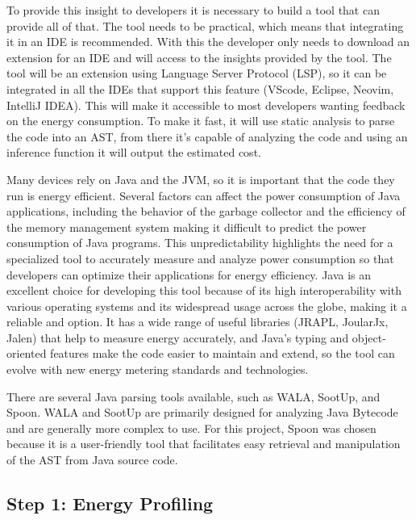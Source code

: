 \documentclass[sigplan]{acmart}
\begin{document}
To provide this insight to developers it is necessary to build a tool that can provide all of that. The tool needs to be practical, which means that integrating it in an IDE is recommended. With this the developer only needs to download an extension for an IDE and will access to the insights provided by the tool.
The tool will be an extension using Language Server Protocol (LSP), so it can be integrated in all the IDEs that support this feature (VScode, Eclipse, Neovim, IntelliJ IDEA). This will make it accessible to most developers wanting feedback on the energy consumption. To make it fast, it will use static analysis to parse the code into an AST, from there it's capable of analyzing the code and using an inference function it will output the estimated cost.

Many devices rely on Java and the JVM, so it is important that the code they run is energy efficient. Several factors can affect the power consumption of Java applications, including the behavior of the garbage collector and the efficiency of the memory management system \cite{10.5555/1267847.1267870} making it difficult to predict the power consumption of Java programs. This unpredictability highlights the need for a specialized tool to accurately measure and analyze power consumption so that developers can optimize their applications for energy efficiency.
Java is an excellent choice for developing this tool because of its high interoperability with various operating systems and its widespread usage across the globe, making it a reliable and option. It has a wide range of useful libraries (JRAPL, JoularJx, Jalen) that help to measure energy accurately, and Java's typing and object-oriented features make the code easier to maintain and extend, so the tool can evolve with new energy metering standards and technologies. 

There are several Java parsing tools available, such as WALA\cite{wala_main}, SootUp\cite{sootup_main}, and Spoon\cite{spoon_main}. WALA and SootUp are primarily designed for analyzing Java Bytecode and are generally more complex to use. For this project, Spoon was chosen because it is a user-friendly tool that facilitates easy retrieval and manipulation of the AST from Java source code.

\subsection{Step 1: Energy Profiling} \label{sec:work_step1_energy_profiling}
\end{document}
